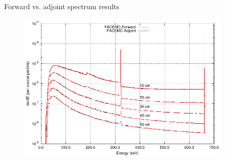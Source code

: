 \documentclass{beamer}
\begin{document}
\begin{frame}{Forward vs. adjoint spectrum results}
  
  \begin{figure}[h!]
     \begin{center}
       \includegraphics[width=4in]{../document/chapters/code_overview/photon_spectrum_validation_comparison.pdf}
     \end{center}
   \end{figure}

\end{frame}

\end{document}
